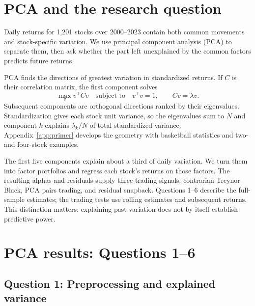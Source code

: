 \documentclass[11pt,letterpaper]{article}
\begin{document}
\section{PCA and the research question}
Daily returns for 1,201 stocks over 2000--2023 contain both common movements and stock-specific variation. We use principal component analysis (PCA) to separate them, then ask whether the part left unexplained by the common factors predicts future returns.

PCA finds the directions of greatest variation in standardized returns. If $C$ is their correlation matrix, the first component solves
\[
\max_v v^\top C v \quad\text{subject to}\quad v^\top v=1,
\qquad Cv=\lambda v.
\]
Subsequent components are orthogonal directions ranked by their eigenvalues. Standardization gives each stock unit variance, so the eigenvalues sum to $N$ and component $k$ explains $\lambda_k/N$ of total standardized variance. Appendix~\ref{app:primer} develops the geometry with basketball statistics and two- and four-stock examples.

The first five components explain about a third of daily variation. We turn them into factor portfolios and regress each stock's returns on those factors. The resulting alphas and residuals supply three trading signals: contrarian Treynor--Black, PCA pairs trading, and residual snapback. Questions 1--6 describe the full-sample estimates; the trading tests use rolling estimates and subsequent returns. This distinction matters: explaining past variation does not by itself establish predictive power.

\section{PCA results: Questions 1--6}

% 
\subsection*{Question 1: Preprocessing and explained variance}
\end{document}

